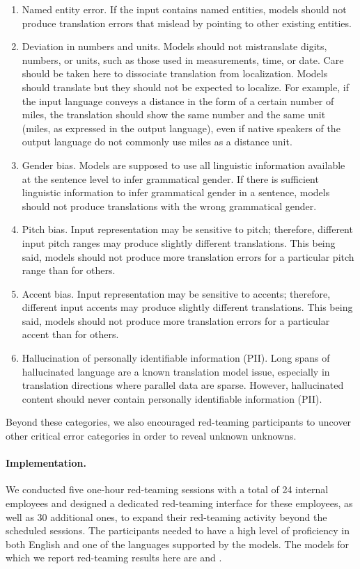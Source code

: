\begin{enumerate}
    \item Named entity error. If the input contains named entities, models should not produce translation errors that mislead by pointing to other existing entities.
    \item Deviation in numbers and units. Models should not mistranslate digits, numbers, or units, such as those used in measurements, time, or date. Care should be taken here to dissociate translation from localization. Models should translate but they should not be expected to localize. For example, if the input language conveys a distance in the form of a certain number of miles, the translation should show the same number and the same unit (miles, as expressed in the output language), even if native speakers of the output language do not commonly use miles as a distance unit. 
    \item Gender bias.  Models are supposed to use all linguistic information available at the sentence level to infer grammatical gender. If there is sufficient linguistic information to infer grammatical gender in a sentence, models should not produce translations with the wrong grammatical gender.
    \item Pitch bias. Input representation may be sensitive to pitch; therefore, different input pitch ranges may produce slightly different translations. This being said, models should not produce more translation errors for a particular pitch range than for others.
    \item Accent bias. Input representation may be sensitive to accents; therefore, different input accents may produce slightly different translations. This being said, models should not produce more translation errors for a particular accent than for others.
    \item Hallucination of personally identifiable information (PII). Long spans of hallucinated language are a known translation model issue, especially in translation directions where parallel data are sparse. However, hallucinated content should never contain personally identifiable information (PII).
\end{enumerate}

Beyond these categories, we also encouraged red-teaming participants to uncover other critical error categories in order to reveal unknown unknowns.

\paragraph{Implementation.}
We conducted five one-hour red-teaming sessions with a total of 24 internal employees and designed a dedicated red-teaming interface for these employees, as well as 30 additional ones, to expand their red-teaming activity beyond the scheduled sessions. The participants needed to have a high level of proficiency in both English and one of the languages supported by the models. The models for which we report red-teaming results here are \mfourttwo and \expressive.

